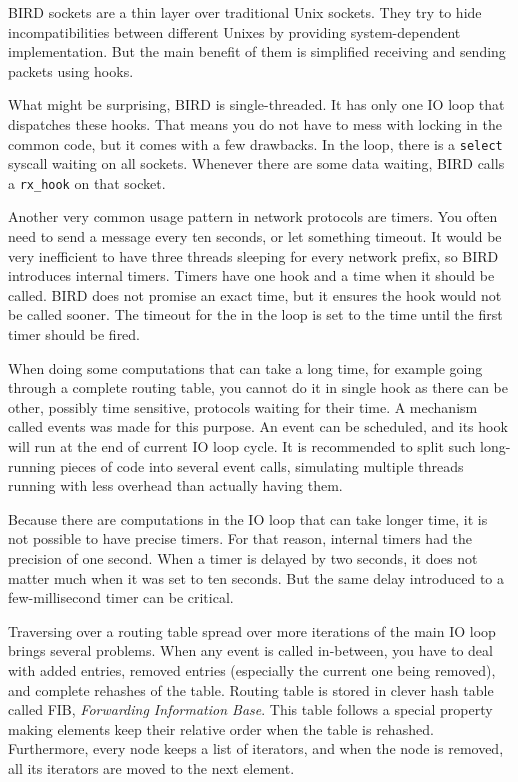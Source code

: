 BIRD sockets are a thin layer over traditional Unix sockets. They try to hide
incompatibilities between different Unixes by providing system-dependent
implementation. But the main benefit of them is simplified receiving and
sending packets using hooks.

What might be surprising, BIRD is single-threaded. It has only one IO loop that
dispatches these hooks. That means you do not have to mess with locking in the
common code, but it comes with a few drawbacks. In the loop, there is
a \texttt{select} syscall waiting on all sockets. Whenever there are some data
waiting, BIRD calls a \verb|rx_hook| on that socket.

Another very common usage pattern in network protocols are timers. You often
need to send a message every ten seconds, or let something timeout. It would be
very inefficient to have three threads sleeping for every network prefix, so BIRD
introduces internal timers. Timers have one hook and a time when it should be
called. BIRD does not promise an exact time, but it ensures the hook would not
be called sooner. The timeout for the  in the loop is set to the time
until the first timer should be fired.

When doing some computations that can take a long time, for example going
through a complete routing table, you cannot do it in single hook as there can be
other, possibly time sensitive, protocols waiting for their time. A mechanism
called events was made for this purpose. An event can be scheduled,
and its hook will run at the end of current IO loop cycle. It is recommended to
split such long-running pieces of code into several event calls, simulating
multiple threads running with less overhead than actually having them.

Because there are computations in the IO loop that can take longer time, it is
not possible to have precise timers. For that reason, internal timers had the
precision of one second. When a timer is delayed by two seconds, it does not
matter much when it was set to ten seconds. But the same delay introduced to
a few-millisecond timer can be critical.

Traversing over a routing table spread over more iterations of the main IO loop
brings several problems. When any event is called in-between, you have to deal
with added entries, removed entries (especially the current one being removed),
and complete rehashes of the table. Routing table is stored in clever hash
table called FIB, \emph{Forwarding Information Base}. This table follows
a special property making elements keep their relative order when the table is
rehashed. Furthermore, every node keeps a list of iterators, and when the node
is removed, all its iterators are moved to the next element.

